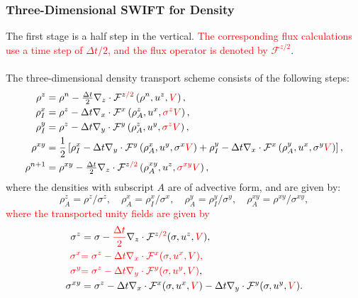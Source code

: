 \documentclass{ametsocV6.1}
\newcommand{\change}[1]{\textcolor{red}{#1}}
\begin{document}
\subsubsection{Three-Dimensional SWIFT for Density} \label{sec:3D_density}
The first stage is a half step in the vertical.
\change{The corresponding flux calculations use a time step of $\Delta t/2$, and the flux operator is denoted by $\mathcal{F}^{z/2}$}.
\\
\\
The three-dimensional density transport scheme consists of the following steps:
\begin{subequations}
\begin{align}
\rho^z & = \rho^n - \tfrac{\Delta t}{2}\nabla_z \cdot \mathcal{F}^{z\change{/2}}\left(\rho^n, u^z, \change{V} \right), \\
\rho_I^x & = \rho^z - \Delta t \nabla_x \cdot \mathcal{F}^x\left(\rho^z_A, u^x, \change{\sigma^z}\change{V} \right), \\
\rho_I^y & = \rho^z - \Delta t \nabla_y \cdot \mathcal{F}^y\left(\rho^z_A, u^y, \change{\sigma^z}\change{V} \right), \\
\rho^{xy} & = \frac{1}{2}\left[\rho_I^x - \Delta t \nabla_y \cdot \mathcal{F}^y\left(\rho^x_A, u^y, \sigma^x\change{V} \right) + \rho_I^y - \Delta t \nabla_x \cdot \mathcal{F}^x\left(\rho_A^y, u^x,\sigma^y\change{V}\right)\right], \\
\rho^{n+1} & = \rho^{xy} - \tfrac{\Delta t}{2}\nabla_z\cdot\mathcal{F}^{z\change{/2}}\left(\rho_A^{xy},u^z,\change{\sigma^{xy}V} \right),
\end{align}
\end{subequations}
where the densities with subscript $A$ are of advective form, and are given by:
\begin{equation}
\rho^z_A = \rho^z / \sigma^z, \quad
\rho^x_A = \rho_I^x / \sigma^x, \quad
\rho^y_A = \rho_I^y / \sigma^y, \quad
\rho^{xy}_A = \rho^{xy} / \sigma^{xy},
\end{equation}
\change{where the transported unity fields are given by}
\begin{subequations}
\begin{align}
\sigma^z & = \sigma - \change{\frac{\Delta t}{2}} \nabla_z \cdot \mathcal{F}^{z\change{/2}}(\sigma,u^z,\change{V}), \\
\change{\sigma^x} & \change{= \sigma^z - \Delta{t} \nabla_x \cdot \mathcal{F}^x(\sigma,u^x,\change{V}),} \\
\change{\sigma^y} & \change{= \sigma^z - \Delta{t} \nabla_y \cdot \mathcal{F}^y(\sigma,u^y,\change{V})}, \\
\sigma^{xy} & = \sigma^z - \Delta{t} \nabla_x \cdot \mathcal{F}^x(\sigma,u^x,\change{V}) - \Delta{t} \nabla_y \cdot \mathcal{F}^y(\sigma,u^y,\change{V}).
\end{align}
\end{subequations}
\end{document}

